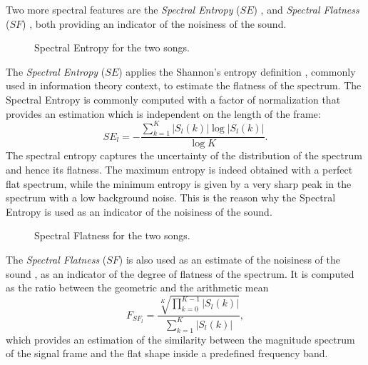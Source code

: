 Two more spectral features are the \textit{Spectral Entropy} ($SE$) \cite{Lartillot2007}, and \textit{Spectral Flatness} ($SF$) \cite{Kim2005}, both providing an indicator of the noisiness of the sound.

\begin{figure}[tb]
        \centering
    \hfil
 \caption{Spectral Entropy for the two songs.}
 \label{fig:LLFs:entropy}          
\end{figure}

The \textit{Spectral Entropy} ($SE$) applies the Shannon's entropy definition \cite{shannon2001}, commonly used in information theory context, to estimate the flatness of the spectrum. The Spectral Entropy is commonly computed \cite{MIRToolbox} with a factor of normalization that provides an estimation which is independent on the length of the frame:
\begin{equation}
	SE_l = -\frac{\sum\limits_{k=1}^{K}|S_l(k)|\log |S_l(k)|}{\log K}.
\end{equation}
The spectral entropy captures the uncertainty of the distribution of the spectrum and hence its flatness. The maximum entropy is indeed obtained with a perfect flat spectrum, while the minimum entropy is given by a very sharp peak in the spectrum with a low background noise. This is the reason why the Spectral Entropy is used as an indicator of the noisiness of the sound.

\begin{figure}[tb]
        \centering
        \hfil
       \caption{Spectral Flatness for the two songs.}
       \label{fig:LLFs:flatness}          
\end{figure}

The \textit{Spectral Flatness} ($SF$) is also used as an estimate of the noisiness of the sound \cite{Rottondi2015}, as an indicator of the degree of flatness of the spectrum. It is computed as the ratio between the geometric and the arithmetic mean
\begin{equation}
	F_{SF_l} = \frac{\sqrt[K]{\prod\limits_{k=0}^{K-1}|S_l(k)|}}{\sum\limits_{k=1}^{K}|S_l(k)|},
\end{equation}
which provides an estimation of the similarity between the magnitude spectrum of the signal frame and the flat shape inside a predefined frequency band. 


